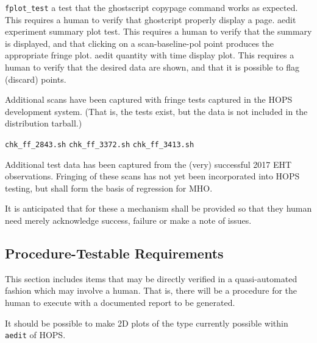 \begin{description}
 \texttt{fplot\_test} a test that the \ac{ghostscript} copypage
    command works as expected.  This requires a human to verify that
    \ac{ghostcript} properly display a page.
 \ac{aedit} experiment summary plot test.  This requires a
    human to verify that the summary is displayed, and that clicking
    on a scan-baseline-pol point produces the appropriate fringe plot.
 \ac{aedit} quantity with time display plot.  This requires
    a human to verify that the desired data are shown, and that it
    is possible to flag (discard) points.
 
\end{description}

Additional scans have been captured with fringe tests captured
in the \ac{HOPS} development system.  (That is, the tests exist,
but the data is not included in the distribution tarball.)

\begin{description}
 \texttt{chk\_ff\_2843.sh}
 \texttt{chk\_ff\_3372.sh}
 \texttt{chk\_ff\_3413.sh}
\end{description}

Additional test data has been captured from the (very) successful
2017 \ac{EHT} observations.  Fringing of these scans has not yet
been incorporated into \ac{HOPS} testing, but shall form the basis
of regression for \ac{MHO}.  \FIXME[elaborate]

It is anticipated that for these a mechanism shall be provided
so that they human need merely acknowledge success, failure or
make a note of issues.

\subsection{Procedure-Testable Requirements}
\label{sec:procedure}

This section includes items that may be directly verified in a quasi-automated
fashion which may involve a human.  That is, there will be a procedure for the
human to execute with a documented report to be generated.

\begin{description}
 It should be possible to make 2D plots of the type
    currently possible within \texttt{\ac{aedit}} of \ac{HOPS}.
 \FIXME[more]


\end{description}

